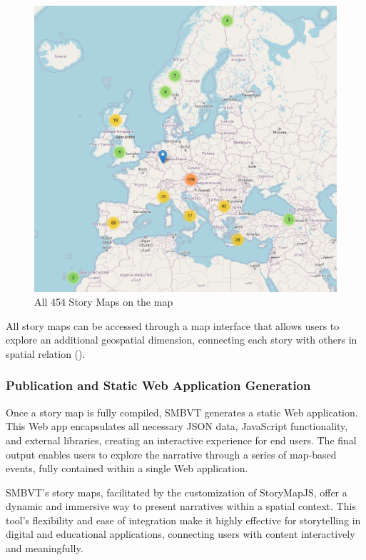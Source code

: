 \begin{figure}[h!tb]
    \centerline {\includegraphics[scale=0.6]{img/allStorymapsMoving.png}}
    \caption{All 454 Story Maps on the map}
    \label{fig:allStorymaps}
\end{figure}

All story maps can be accessed through a map interface that allows users to explore an additional geospatial dimension, connecting each story with others in spatial relation ().

\subsubsection{Publication and Static Web Application Generation}
Once a story map is fully compiled, SMBVT generates a static Web application. This Web app encapsulates all necessary JSON data, JavaScript functionality, and external libraries, creating an interactive experience for end users. The final output enables users to explore the narrative through a series of map-based events, fully contained within a single Web application.

SMBVT’s story maps, facilitated by the customization of StoryMapJS, offer a dynamic and immersive way to present narratives within a spatial context. This tool’s flexibility and ease of integration make it highly effective for storytelling in digital and educational applications, connecting users with content interactively and meaningfully.


